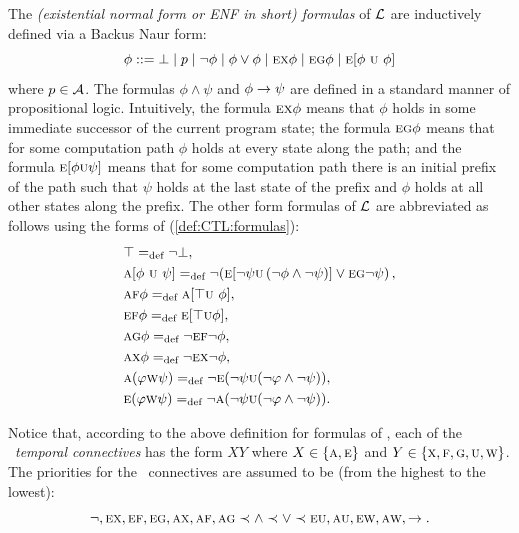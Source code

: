 \documentclass{article}
\begin{document}
The {\em (existential normal form or ENF in short) formulas} of
$\cal L$ are inductively defined via a Backus Naur form:
\begin{equation}\label{def:CTL:formulas}
  \phi ::= \bot\mid p \mid\neg\phi \mid \phi\lor\phi \mid
    \EXIST \NEXT \phi \mid
    \EXIST \GLOBAL \phi \mid
    \EXIST [\phi\ \UNTIL\ \phi]%
\end{equation}
where $p\in\cal A$. The formulas $\phi\land\psi$ and $\phi\rightarrow\psi$
are defined in a standard manner of propositional logic. Intuitively,
the formula $\textsc{e}\textsc{x}\phi$ means that $\phi$ holds in some immediate successor
of the current program state; the formula $\textsc{e}\textsc{g}\phi$ means
that for some computation path $\phi$ holds at every state along the path; and the
formula $\textsc{e}[\phi\textsc{u}\psi]$ means that
for some computation path there is an initial prefix of the path such
that $\psi$ holds at the last state of the prefix  and $\phi$ holds at all other
states along the prefix.
The other form formulas of $\cal L$ are abbreviated as follows
using the forms of (\ref{def:CTL:formulas}):
\begin{align*}
  & \top =_{\textrm{def}} \neg\bot,\\
  & \textsc{a} [\phi\ \textsc{u}\ \psi] =_{\textrm{def}}
    \neg(\textsc{e}[\neg\psi\textsc{u} \left(\neg \phi\land\neg\psi)]\lor\textsc{e}\textsc{g}\neg\psi\right),\\
  & \textsc{a}\textsc{f}\phi=_{\textrm{def}}   \textsc{a} [\top \textsc{u}\ \phi],\\
  & \textsc{e}\textsc{f}\phi=_{\textrm{def}}\textsc{e}[\top\textsc{u}\phi],\\
  & \textsc{a}\textsc{g}\phi =_{\textrm{def}} \neg\textsc{e}\textsc{f}\neg\phi,\\
  & \textsc{a}\textsc{x}\phi =_{\textrm{def}} \neg\textsc{e}\textsc{x}\neg\phi,\\
  & \textsc{a}(\varphi \textsc{w} \psi) =_{\textrm{def}} \neg \textsc{e}(\neg \psi \textsc{u} (\neg \varphi \wedge \neg \psi)),\\
  & \textsc{e} (\varphi \textsc{w} \psi) =_{\textrm{def}} \neg \textsc{a}(\neg \psi \textsc{u} (\neg \varphi \wedge \neg \psi)).
\end{align*}

Notice that, according to the
above definition for formulas of \CTL,
each of the \CTL\ {\em temporal connectives} has the form $XY$
where $X\in \{\textsc{a},\textsc{e}\}$ and  $Y\in\{\textsc{x}, \textsc{f}, \textsc{g}, \textsc{u}, \textsc{w}\}$.
The priorities for the \CTL\ connectives are assumed to be (from the highest to the lowest):
\begin{equation*}
  \neg, \textsc{e}\textsc{x}, \textsc{e}\textsc{f}, \textsc{e}\textsc{g}, \textsc{a}\textsc{x}, \textsc{a}\textsc{f}, \textsc{a}\textsc{g}
  \prec \land \prec \lor \prec \textsc{e}\textsc{u}, \textsc{a}\textsc{u}, \textsc{e} \textsc{w}, \textsc{a} \textsc{w}, \rightarrow.
\end{equation*}
\end{document}
